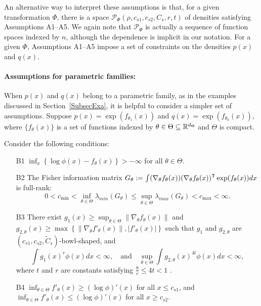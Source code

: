 \documentclass{article}
\begin{document}
An alternative way to interpret these assumptions is that, for a given transformation $\Phi$, there is a space $\mathcal{P}_{\Phi}(\rho, c_{s1}, c_{s2}, C_s, r, t)$ of densities satisfying Assumptions A1--A5. We again note that $\mathcal{P}_\Phi$ is actually a sequence of function spaces indexed by $n$, although the dependence is implicit in our notation. For a given $\Phi$, Assumptions A1--A5 impose a set of constraints on the densities $p(x)$ and $q(x)$. %


\paragraph{\textbf{Assumptions for parametric families:}} When $p(x)$ and $q(x)$ belong to a parametric family, as in the examples discussed in Section~\ref{SubsecExa}, it is helpful to consider a simpler set of assumptions. Suppose $p(x) = \exp( f_{\theta_1}(x))$ and $q(x) = \exp( f_{\theta_0}(x))$, where $\{f_{\theta}(x)\}$ is a set of functions indexed by $\theta \in \Theta \subseteq {\mathbb R}^{d_{\Theta}}$ and $\Theta$ is compact.

Consider the following conditions:

\begin{enumerate}
\item[B1] $\inf_{x} \left\{\log \phi(x) - f_\theta(x) \right\} > -\infty$ for all $\theta \in \Theta$.
\item[B2] The Fisher information matrix $G_\theta := \int (\nabla_{\theta} f_{\theta}(x)) 
                                    (\nabla_{\theta} f_{\theta}(x))^{\mathsf{T}} 
                      \exp( f_{\theta}(x)) dx$
is full-rank:
   \[
 0<   c_{\min} <  \inf_{\theta \in \Theta} \lambda_{min}(G_\theta) \leq \sup_{\theta \in \Theta} \lambda_{max}(G_{\theta}) < c_{\max} < \infty.
  \]
\item[B3] There exist $g_1(x) \geq \sup_{\theta \in \Theta} \| \nabla_\theta f_\theta(x) \|$ and $g_{2,\theta}(x) \geq \max\left\{\| \nabla_\theta f'_\theta(x) \|, |f'_\theta(x)| \right\}$  such that $g_1$ and $g_{2, \theta}$ are $(c_{s1}, c_{s2}, \tilde{C}_s)$-bowl-shaped, and
\[
   \int g_1(x)^r \phi(x) dx < \infty, \quad \text{and} \quad 
   \sup_{\theta \in \Theta} \int g_{2, \theta}(x)^{4t} \phi(x) dx < \infty,
\]
where $t$ and $r$ are constants satisfying $\frac{8}{r} \le 4t < 1$ .
\item[B4] $\inf_{\theta \in \Theta} f'_\theta(x) \geq (\log \phi)'(x) $ for all $x \leq c_{s1}$, and $\inf_{\theta \in \Theta} f'_\theta(x) \leq (\log \phi)'(x) $ for all $x \geq c_{s2}$.
\end{enumerate}
\end{document}
